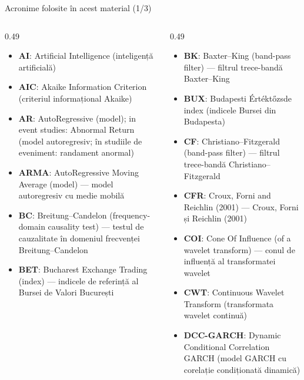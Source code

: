 {
\begin{frame}[noframenumbering]
    \titlepage
\end{frame}
}
\begin{frame}{Acronime folosite în acest material (1/3)}
\begin{columns}[T]
\begin{column}{0.49\textwidth}
\begin{itemize}\setlength{\itemsep}{0pt}
    \item \textbf{AI}: Artificial Intelligence (inteligență artificială)
    \item \textbf{AIC}: Akaike Information Criterion (criteriul informațional Akaike)
    \item \textbf{AR}: AutoRegressive (model); in event studies: Abnormal Return (model autoregresiv; în studiile de eveniment: randament anormal)
    \item \textbf{ARMA}: AutoRegressive Moving Average (model) — model autoregresiv cu medie mobilă
    \item \textbf{BC}: Breitung–Candelon (frequency-domain causality test) — testul de cauzalitate în domeniul frecvenței Breitung–Candelon
    \item \textbf{BET}: Bucharest Exchange Trading (index) — indicele de referință al Bursei de Valori București
\end{itemize}
\end{column}
\begin{column}{0.49\textwidth}
\begin{itemize}\setlength{\itemsep}{0pt}
    \item \textbf{BK}: Baxter–King (band-pass filter) — filtrul trece-bandă Baxter–King
    \item \textbf{BUX}: Budapesti Értéktőzsde index (indicele Bursei din Budapesta)
    \item \textbf{CF}: Christiano–Fitzgerald (band-pass filter) — filtrul trece-bandă Christiano–Fitzgerald
    \item \textbf{CFR}: Croux, Forni and Reichlin (2001) — Croux, Forni și Reichlin (2001)
    \item \textbf{COI}: Cone Of Influence (of a wavelet transform) — conul de influență al transformatei wavelet
    \item \textbf{CWT}: Continuous Wavelet Transform (transformata wavelet continuă)
    \item \textbf{DCC-GARCH}: Dynamic Conditional Correlation GARCH (model GARCH cu corelație condiționată dinamică)
\end{itemize}
\end{column}
\end{columns}
\end{frame}
